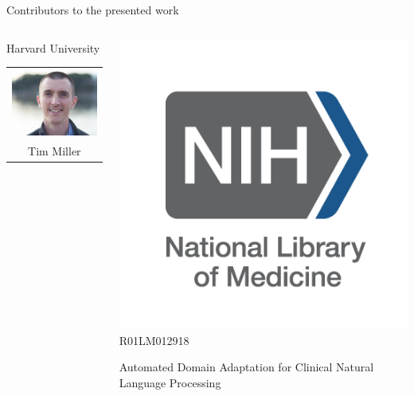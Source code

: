 \documentclass[14pt]{beamer}
\begin{document}
\begin{frame}{Contributors to the presented work}
\vspace*{-0.5\baselineskip}
\begin{columns}[T]
\begin{column}{0.45\textwidth}
\begin{block}{Harvard University}
\centering
\begin{tabular}{c}
\includegraphics[height=0.2\textheight]{Tim.jpg} \\
Tim Miller
\end{tabular}
\end{block}
\end{column}
\begin{column}{0.5\textwidth}
\bigskip

\includegraphics[trim=30 50 30 50, clip, height=2\baselineskip, valign=t]{nih_nlm.png} R01LM012918


Automated Domain Adaptation for Clinical Natural Language Processing
\end{column}
\end{columns}
\end{frame}
\end{document}
